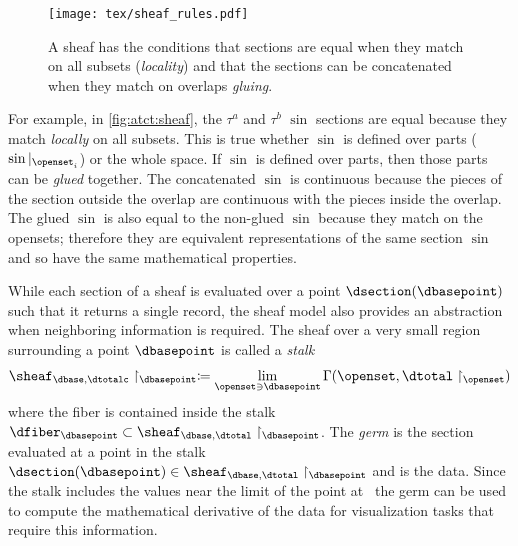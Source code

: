 \documentclass[journal]{IEEEtran}
\theoremstyle{definition}
\theoremstyle{remark}
\begin{document}
\begin{figure}[h]
  \texttt{[image: tex/sheaf\_rules.pdf]}
  \caption{A sheaf has the conditions that sections are equal when they match on all subsets (\textit{locality}) and that the sections can be concatenated when they match on overlaps \textit{gluing}.\label{fig:atct:sheaf}}
\end{figure}

For example, in \autoref{fig:atct:sheaf}, the $\tau^{a}$ and $\tau^{b}$ $\sin$ sections are equal because they match \textit{locally} on all subsets. This is true whether $\sin$ is defined over parts ($\sin\vert_{\openset_i}$) or the whole space. If $\sin$ is defined over parts, then those parts can be \textit{glued} together. The concatenated $\sin$ is continuous because the pieces of the section outside the overlap are continuous with the pieces inside the overlap. The glued $\sin$ is also equal to the non-glued $\sin$ because they match on the opensets; therefore they are equivalent representations of the same section $\sin$ and so have the same mathematical properties.

While each section of a sheaf is evaluated over a point $\dsection(\dbasepoint)$ such that it returns a single record, the sheaf model also provides an abstraction when neighboring information is required. The sheaf over a very small region surrounding a point $\dbasepoint$ is called a \textit{stalk}\cite{harder2008lectures}
\begin{equation}
  \label{eq:atct:sheaf:stalk}
    \sheaf_{\dbase, \dtotalc}\restriction_{\dbasepoint}\coloneqq \lim\limits_{\openset\ni \dbasepoint} \Gamma(\openset, \dtotal\restriction_{\openset})
\end{equation}
where the fiber is contained inside the stalk  $\dfiber_{\dbasepoint} \subset  \sheaf_{\dbase, \dtotal}\restriction_{\dbasepoint}$. The \textit{germ} is the section evaluated at a point in the stalk  $\dsection(\dbasepoint) \in \sheaf_{\dbase, \dtotal}\restriction_{\dbasepoint}$ and is the data. Since the stalk includes the values near the limit of the point at \dbasepoint\, the germ can be used to compute the mathematical derivative of the data for visualization tasks that require this information.
\end{document}
